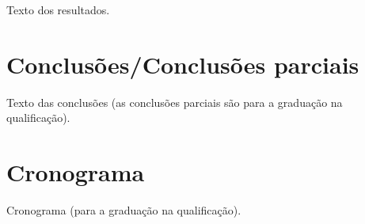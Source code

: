\documentclass[
	article,			%
	11pt,				%
	oneside,			%
	a4paper,			%
	chapter=TITLE,		%
	section=TITLE,		%
	english,			%
	brazil,				%
	sumario=tradicional
]{abntex2}
\begin{document}
     Texto dos resultados.
     
     
     

	\section{Conclusões/Conclusões parciais}
	
	Texto das conclusões (as conclusões parciais são para a graduação na qualificação).
    
    
    

	\section{Cronograma}
	
	Cronograma (para a graduação na qualificação).
	
	
	\postextual
	
	
	
\end{document}
